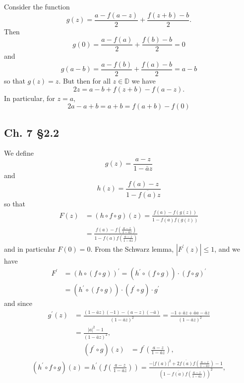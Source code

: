 \documentclass{article}
\begin{document}
Consider the function
$$
  g(z)
= \frac{a - f(a - z)}
       {2}
+ \frac{f(z + b) - b}
       {2}.
$$
Then
$$
  g(0)
= \frac{a - f(a)}{2}
+ \frac{f(b) - b}{2}
= 0
$$
and
$$
  g(a - b)
= \frac{a - f(b)}{2}
+ \frac{f(a) - b}{2}
= a - b
$$
so that $g(z) = z$. But then for all $z \in \mathbb{D}$
we have
$$
2z = a - b + f(z + b) - f(a - z).
$$
In particular, for $z = a$,
$$
2a - a + b = a + b = f(a + b) - f(0)
$$

\subsection{Ch. 7 \S 2.2}
We define
$$
g(z) = \frac{a - z}
            {1 - \bar{a} z}
$$
and
$$
h(z) = \frac{f(a) - z}
            {1 - \overline{f(a)} z}
$$
so that
\begin{align*}
   F(z)
&= (h \circ f \circ g)(z)
 = \frac{f(a) - f(g(z))}
        {1 - \overline{f(a)} f(g(z))} \\
&= \frac{ f(a)
        - f\left(
             \frac{a - z}
                  {1 - \bar{a} z}
           \right)}
        { 1
        - \overline{f(a)}
          f\left(
            \frac{a - z}
                 {1 - \bar{a} z}
          \right)}
\end{align*}
and in particular $F(0) = 0$. From the Schwarz lemma,
$|F^\prime(z)| \leq 1$, and we have
\begin{align*}
   F^\prime
&= (h \circ (f \circ g))^\prime
 = (h^\prime \circ (f \circ g)) \cdot (f \circ g)^\prime \\
&= (h^\prime \circ (f \circ g)) \cdot
   (f^\prime \circ g) \cdot
   g^\prime
\end{align*}
and since
\begin{align*}
  g^\prime(z)
&= \frac{(1 - \bar{a} z)(-1) - (a - z)(-\bar{a})}
        {(1 - \bar{a} z)^2}
 = \frac{-1 + \bar{a} z + \bar{a} a - \bar{a} z}
        {(1 - \bar{a} z)^2} \\
&= \frac{|a|^2 - 1}
        {(1 - \bar{a} z)^2},
\end{align*}
\begin{align*}
   (f^\prime \circ g)(z)
&= f^\prime\left(\frac{a - z}{1 - \bar{a} z}\right),
\end{align*}
\begin{align*}
  (h^\prime \circ f \circ g)(z)
= h^\prime\left(f\left(\frac{a - z}{1 - \bar{a}z}\right)\right)
= \frac{ -|f(a)|^2
       + 2 \overline{f(a)}
           f\left(\frac{a - z}{1 - \bar{a}z}\right)
       - 1}
       {\left(
          1
        - \overline{f(a)}
          f\left(\frac{a - z}{1 - \bar{a} z}\right)
        \right)^2},
\end{align*}
\end{document}
